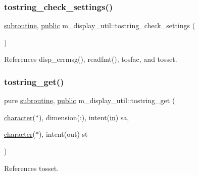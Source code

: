 \subsubsection{\texorpdfstring{tostring\+\_\+check\+\_\+settings()}{tostring\_check\_settings()}}
{\footnotesize\ttfamily \hyperlink{M__stopwatch_83_8txt_acfbcff50169d691ff02d4a123ed70482}{subroutine}, \hyperlink{M__stopwatch_83_8txt_a2f74811300c361e53b430611a7d1769f}{public} m\+\_\+display\+\_\+util\+::tostring\+\_\+check\+\_\+settings (\begin{DoxyParamCaption}{ }\end{DoxyParamCaption})}



References disp\+\_\+errmsg(), readfmt(), tosfac, and tosset.

\mbox{\label{namespacem__display__util_a8329f722c059861aa54faa8f7668cc41}} 
\subsubsection{\texorpdfstring{tostring\+\_\+get()}{tostring\_get()}}
{\footnotesize\ttfamily pure \hyperlink{M__stopwatch_83_8txt_acfbcff50169d691ff02d4a123ed70482}{subroutine}, \hyperlink{M__stopwatch_83_8txt_a2f74811300c361e53b430611a7d1769f}{public} m\+\_\+display\+\_\+util\+::tostring\+\_\+get (\begin{DoxyParamCaption}\item[{\hyperlink{option__stopwatch_83_8txt_abd4b21fbbd175834027b5224bfe97e66}{character}($\ast$), dimension(\+:), intent(\hyperlink{M__journal_83_8txt_afce72651d1eed785a2132bee863b2f38}{in})}]{sa,  }\item[{\hyperlink{option__stopwatch_83_8txt_abd4b21fbbd175834027b5224bfe97e66}{character}($\ast$), intent(out)}]{st }\end{DoxyParamCaption})}



References tosset.

\mbox{\label{namespacem__display__util_a7803f63457d826fc3b8fe7ddfa7818ac}} 
